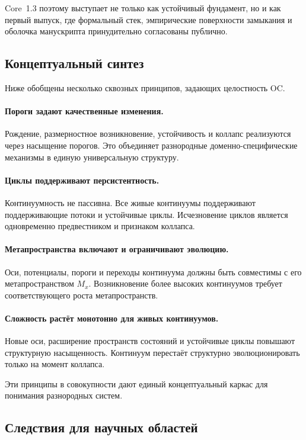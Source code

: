 Core~1.3 поэтому выступает не только как устойчивый фундамент, но и как первый
выпуск, где формальный стек, эмпирические поверхности замыкания и оболочка
манускрипта принудительно согласованы публично.

\subsection{Концептуальный синтез}

Ниже обобщены несколько сквозных принципов, задающих целостность OC.

\paragraph{Пороги задают качественные изменения.}
Рождение, размерностное возникновение, устойчивость и коллапс реализуются через
насыщение порогов.
Это объединяет разнородные доменно-специфические механизмы в единую универсальную
структуру.

\paragraph{Циклы поддерживают персистентность.}
Континуумность не пассивна.
Все живые континуумы поддерживают поддерживающие потоки и устойчивые циклы.
Исчезновение циклов является одновременно предвестником и признаком коллапса.

\paragraph{Метапространства включают и ограничивают эволюцию.}
Оси, потенциалы, пороги и переходы континуума должны быть совместимы с
его метапространством \(M_x\).
Возникновение более высоких континуумов требует соответствующего роста метапространств.

\paragraph{Сложность растёт монотонно для живых континуумов.}
Новые оси, расширение пространств состояний и устойчивые циклы повышают
структурную насыщенность.
Континуум перестаёт структурно эволюционировать только на момент коллапса.

Эти принципы в совокупности дают единый концептуальный каркас для понимания
разнородных систем.

\subsection{Следствия для научных областей}

